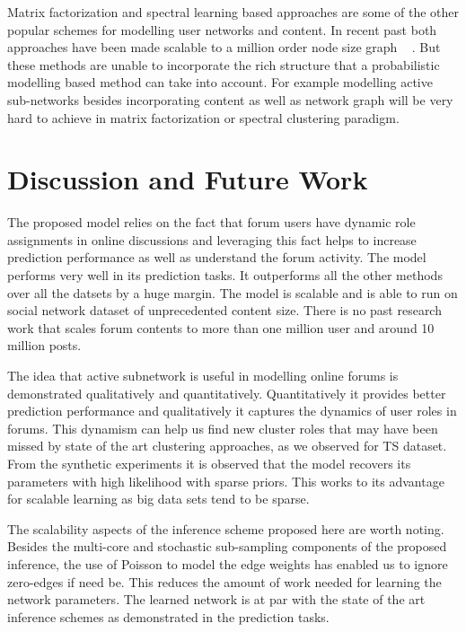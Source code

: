 \documentclass{sig-alternate}
\begin{document}
Matrix factorization and spectral learning based approaches are some of the
other popular schemes for modelling user networks and content. In recent
past both approaches have been made scalable to a million order node size graph
~ \cite{Gemulla:2011:LMF,Dhillon:2005:FKM}. But these methods are unable to incorporate 
the rich structure that a probabilistic modelling based method can take into account.
For example modelling active sub-networks besides incorporating content as well
as network graph will be very hard to achieve in matrix factorization or 
spectral clustering paradigm.



\section{Discussion and Future Work}
The  proposed model relies on the fact that forum users have dynamic role
assignments in online discussions and leveraging this fact helps to increase
prediction performance as well as understand the forum activity. The model
performs very well in its prediction tasks. It outperforms all the other methods
over all the datsets by a huge margin. The model is scalable and is able to run
on social network dataset of unprecedented content size. There is no past
research work that scales forum contents to more than one  million user and
around 10 million posts. 

The idea that active subnetwork is useful in modelling online forums is
demonstrated qualitatively and quantitatively. Quantitatively it provides better
prediction performance and qualitatively it captures the dynamics of user
roles in forums. This dynamism can help us find new cluster roles that may have
been missed by state of the art clustering approaches, as we observed for
TS dataset. From the synthetic experiments it is observed that the model
recovers its parameters with high likelihood with sparse priors. This works to
its advantage for scalable learning as big data sets tend to be sparse.

The scalability aspects of the inference scheme proposed here are worth noting.
Besides the multi-core and stochastic sub-sampling components of the proposed
inference, the use of Poisson to model the edge weights has enabled us to 
ignore zero-edges if need be. This reduces the amount of work needed for
learning the network parameters. The learned network is at par with the state of the art
inference schemes as demonstrated in the prediction tasks.   
\end{document}
